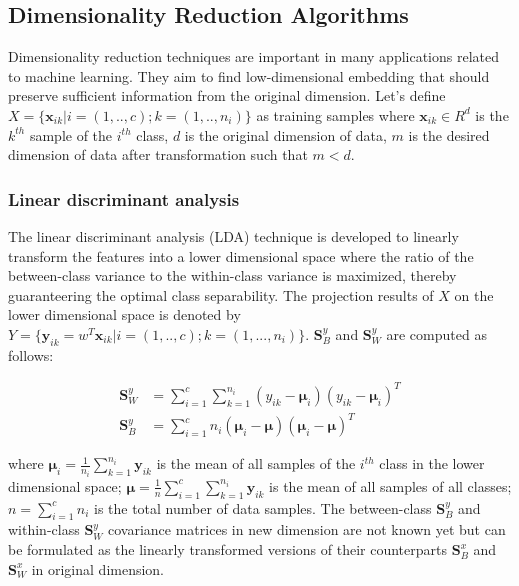 
\subsection{Dimensionality Reduction Algorithms}
    Dimensionality reduction techniques are important in many applications related to machine learning.
    They aim to find low-dimensional embedding that should preserve sufficient information from the original dimension.
    Let's define $X = \{\boldsymbol{x}_{ik}|i=(1,..,c);k=(1,..,n_{i})\}$ as training samples where $\boldsymbol{x}_{ik} \in R^{d}$ is the $k^{th}$ sample of the $i^{th}$ class, $d$ is the original dimension of data, $m$ is the desired dimension of data after transformation such that $m < d$.

    \subsubsection{Linear discriminant analysis}
        The linear discriminant analysis (LDA) technique is developed to linearly transform the features into a lower dimensional space where the ratio of the between-class variance to the within-class variance is maximized, thereby guaranteering the optimal class separability.
        The projection results of $X$ on the lower dimensional space is denoted by $Y = \{\boldsymbol{y}_{ik} = w^T\boldsymbol{x}_{ik}|i=(1,..,c); k=(1,...,n_{i})\}$. $\boldsymbol{S}_B^y$ and $\boldsymbol{S}_W^y$ are computed as follows: 

        \begin{align}
            \boldsymbol{S}_W^y &= \sum_{i=1}^{c}\sum_{k=1}^{n_{i}}(y_{ik}-\boldsymbol{\mu}_i)(y_{ik}-\boldsymbol{\mu}_i)^T \label{eq:LDA_Sw_y}\\
            \boldsymbol{S}_B^y &= \sum_{i=1}^{c}n_i(\boldsymbol{\mu}_i - \boldsymbol{\mu})(\boldsymbol{\mu}_i - \boldsymbol{\mu})^T \label{eq:LDA_Sb_y}
        \end{align}

        where $\boldsymbol{\mu}_i=\frac{1}{n_i}{\sum_{k=1}^{n_{i}}}{\boldsymbol{y}_{ik}}$ is the mean of all samples of the $i^{th}$ class in the lower dimensional space; $\boldsymbol{\mu}=\frac{1}{n}\sum_{i=1}^{c}{\sum_{k=1}^{n_{i}}{\boldsymbol{y}_{ik}}}$ is the mean of all samples of all classes; $n=\sum_{i=1}^{c}n_i$ is the total number of data samples.
        The between-class $\boldsymbol{S}_B^y$ and within-class $\boldsymbol{S}_W^y$ covariance matrices in new dimension are not known yet but can be formulated as the linearly transformed versions of their counterparts $\boldsymbol{S}_B^x$ and $\boldsymbol{S}_W^x$ in original dimension.

